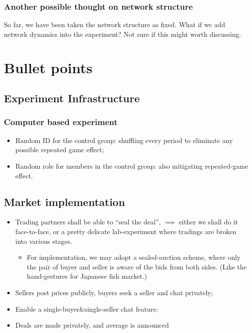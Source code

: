 \documentclass{article}
\begin{document}
\subsubsection{Another possible thought on network structure}

So far, we have been taken the network structure as fixed. What if we add
network dynamics into the experiment? Not sure if this might worth discussing.

\section{Bullet points}

\subsection{Experiment Infrastructure}

\subsubsection{Computer based experiment}

\begin{itemize}
    \item Random ID for the control group: shuffling every period to eliminate 
    any possible repeated game effect;
    \item Random role for members in the control group: also mitigating 
    repeated-game effect.
\end{itemize}


\subsection{Market implementation}

\begin{itemize}
    \item Trading partners shall be able to ``seal the deal'', $\implies$ either we 
    shall do it face-to-face, or a pretty delicate lab-experiment where tradings are 
    broken into various stages.
    \begin{itemize}
        \item For implementation, we may adopt a sealed-auction scheme, where only the 
        pair of buyer and seller is aware of the bids from both sides. (Like the hand-gestures 
        for Japanese fish market.)
    \end{itemize}
    \item Sellers post prices publicly, buyers seek a seller and chat privately;
    \item Enable a single-buyer&single-seller chat feature;
    \item Deals are made privately, and average is announced 
\end{itemize}
\end{document}
